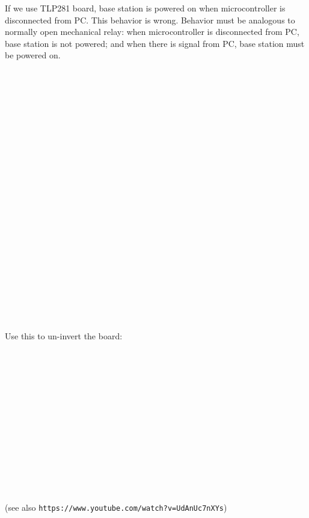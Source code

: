 \nopagenumbers
If we use TLP281 board, base station is powered on when microcontroller is disconnected from PC.
This behavior is wrong. Behavior must be analogous to normally open mechanical relay: when
microcontroller is disconnected from PC, base station is not powered; and when
there is signal from PC, base station must be powered on.
$$\hbox to16cm{\vbox to5.82cm{\vfil\special{psfile=tlp2.eps
  clip llx=0 lly=0 urx=863 ury=314 rwi=4535}}\hfil}$$
$$\hbox to15.38cm{\vbox to7.26722222222222cm{\vfil\special{psfile=tlp1.eps
  clip llx=0 lly=0 urx=436 ury=206 rwi=4360}}\hfil}$$
Use this to un-invert the board:
$$\hbox to7.26cm{\vbox to6.24416666666667cm{\vfil\special{psfile=tlp.1
  clip llx=-1 lly=-33 urx=205 ury=144 rwi=2060}}\hfil}$$
\vfil
(see also {\tt https://www.youtube.com/watch?v=UdAnUc7nXYs})
\bye
